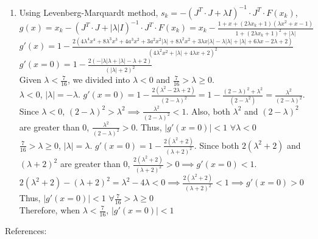 \documentclass[11pt]{article}
\begin{document}
\begin{solution}
\begin{enumerate}
    
    \item Using Levenberg-Marquardt method, 
    $s_k =- (J^T \cdot J + \lambda I)^{-1}\cdot J^T \cdot F(x_k)$,\\
    $g(x) = x_k - (J^T \cdot J + |\lambda| I)^{-1}\cdot J^T \cdot F(x_k) = x_k - \frac{1 + x + (2 \lambda x_k + 1)(\lambda x^2 + x - 1)}{1 + (2 \lambda x_k + 1)^2 + |\lambda|}$\\
    $g'(x) = 1 - \frac{2(4\lambda^4x^4 + 8 \lambda^3x^3 + 4a^3x^2+3a^2x^2|\lambda| + 8\lambda^2 x^2+ 3\lambda x|\lambda| - \lambda|\lambda| + |\lambda| + 6\lambda x - 2\lambda +2 )}{(4\lambda^2x^2 + |\lambda| + 4\lambda x + 2)^2}$\\
    $g'(x = 0) = 1 - \frac{2(-|\lambda|\lambda + |\lambda| - \lambda + 2)}{(|\lambda| + 2)^2}$\\
    
    Given $\lambda < \frac{7}{16}$, we divided into $\lambda < 0$ and $\frac{7}{16} > \lambda \geq 0$.\\
    
    $\lambda < 0$, $|\lambda| = -\lambda$. $g'(x = 0) = 1 - \frac{2(\lambda^2 - 2\lambda + 2)}{(2 - \lambda)^2} = 1 - \frac{(2-\lambda)^2+\lambda^2}{(2-\lambda^2)} = \frac{\lambda^2}{(2-\lambda)^2}$. Since $\lambda < 0$, $(2-\lambda)^2 > \lambda^2 \implies \frac{\lambda^2}{(2-\lambda)^2} < 1$. Also, both $\lambda^2$ and $(2-\lambda)^2$ are greater than $0$, $\frac{\lambda^2}{(2-\lambda)^2} > 0$. Thus, $|g'(x = 0)| < 1$ $\forall { \lambda < 0}$\\
    
    $\frac{7}{16} > \lambda \geq 0$, $|\lambda| = \lambda$. $g'(x = 0) = 1 - \frac{2(\lambda^2 + 2)}{(\lambda + 2)^2}$. Since both $2(\lambda^2 + 2)$ and $(\lambda + 2)^2$ are greater than $0$, $\frac{2(\lambda^2 + 2)}{(\lambda + 2)^2} > 0 \implies g'(x = 0) < 1$.\\
    $2(\lambda^2 + 2) - (\lambda + 2)^2  = \lambda^2 - 4\lambda < 0 \implies \frac{2(\lambda^2 + 2)}{(\lambda + 2)^2} < 1 \implies g'(x = 0) > 0$\\
    Thus, $|g'(x = 0)| < 1$ $\forall { \frac{7}{16} > \lambda \geq 0}$\\
    
    Therefore, when $\lambda < \frac{7}{16}$, $|g'(x=0)| < 1$
    
    
\end{enumerate}

\end{solution}
References: \\ 
\end{document}
